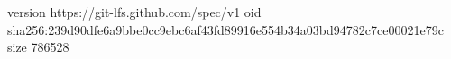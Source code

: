 version https://git-lfs.github.com/spec/v1
oid sha256:239d90dfe6a9bbe0cc9ebc6af43fd89916e554b34a03bd94782c7ce00021e79c
size 786528
